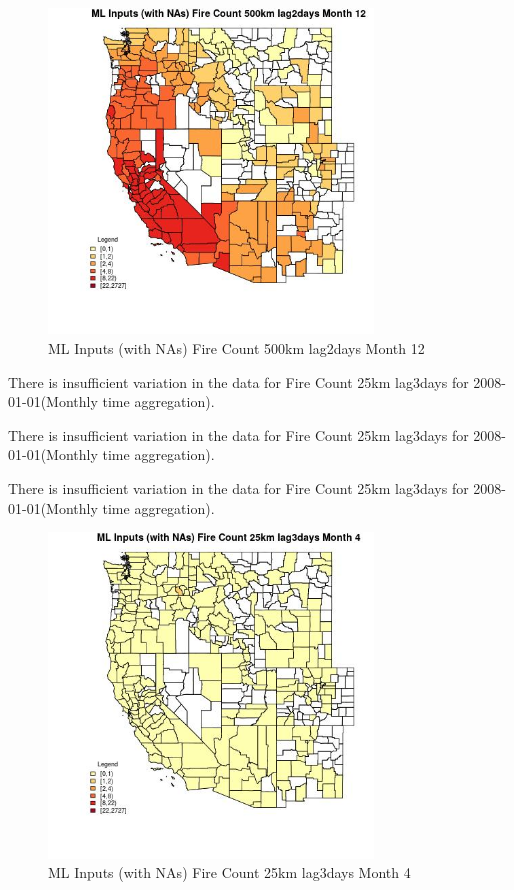 \begin{figure} 
\centering  
\includegraphics[width=0.77\textwidth]{Code_Outputs/Report_ML_input_PM25_Step4_part_f_de_duplicated_aveswNAs_CountyFire_Count_500km_lag2daysmedianMonth12.jpg} 
\caption{\label{fig:Report_ML_input_PM25_Step4_part_f_de_duplicated_aveswNAsCountyFire_Count_500km_lag2daysmedianMonth12}ML Inputs (with NAs) Fire Count 500km lag2days Month 12} 
\end{figure} 
 

There is insufficient variation in the data for Fire Count 25km lag3days for 2008-01-01(Monthly time aggregation). 
 

There is insufficient variation in the data for Fire Count 25km lag3days for 2008-01-01(Monthly time aggregation). 
 

There is insufficient variation in the data for Fire Count 25km lag3days for 2008-01-01(Monthly time aggregation). 
 

\begin{figure} 
\centering  
\includegraphics[width=0.77\textwidth]{Code_Outputs/Report_ML_input_PM25_Step4_part_f_de_duplicated_aveswNAs_CountyFire_Count_25km_lag3daysmedianMonth4.jpg} 
\caption{\label{fig:Report_ML_input_PM25_Step4_part_f_de_duplicated_aveswNAsCountyFire_Count_25km_lag3daysmedianMonth4}ML Inputs (with NAs) Fire Count 25km lag3days Month 4} 
\end{figure} 
 

